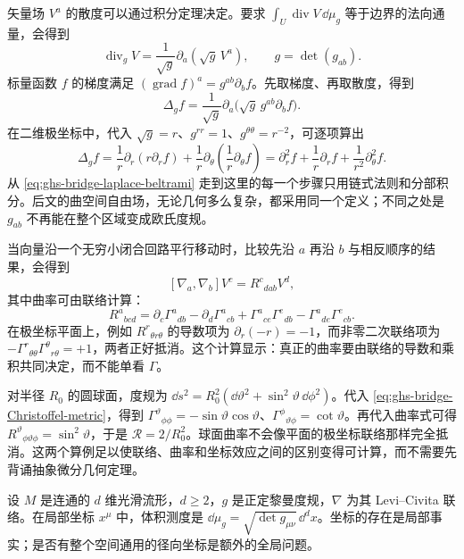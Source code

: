矢量场 $V^a$ 的散度可以通过积分定理决定。要求 $\int_U\operatorname{div}V\,\dd\mu_g$ 等于边界的法向通量，会得到
\[
 \operatorname{div}_gV=\frac1{\sqrt{g}}\partial_a(\sqrt g\,V^a),
 \qquad g=\det(g_{ab}).
\]
标量函数 $f$ 的梯度满足 $(\operatorname{grad}f)^a=g^{ab}\partial_bf$。先取梯度、再取散度，得到
\begin{equation}\label{eq:ghs-bridge-laplace-beltrami}
 \Delta_gf=\frac1{\sqrt g}\partial_a\bigl(\sqrt g\,g^{ab}\partial_bf\bigr).
\end{equation}
在二维极坐标中，代入 $\sqrt g=r$、$g^{rr}=1$、$g^{\theta\theta}=r^{-2}$，可逐项算出
\[
 \Delta_gf=\frac1r\partial_r(r\partial_rf)
 +\frac1r\partial_\theta\left(\frac1r\partial_\theta f\right)
 =\partial_r^2f+\frac1r\partial_rf+\frac1{r^2}\partial_\theta^2f.
\]
从 \cref{eq:ghs-bridge-laplace-beltrami} 走到这里的每一个步骤只用链式法则和分部积分。后文的曲空间自由场，无论几何多么复杂，都采用同一个定义；不同之处是 $g_{ab}$ 不再能在整个区域变成欧氏度规。

当向量沿一个无穷小闭合回路平行移动时，比较先沿 $a$ 再沿 $b$ 与相反顺序的结果，会得到
\[
 [\nabla_a,\nabla_b]V^c=R^c{}_{dab}V^d,
\]
其中曲率可由联络计算：
\begin{equation}\label{eq:ghs-bridge-Riemann-coordinate}
 R^a{}_{bcd}=\partial_c\Gamma^a{}_{db}-\partial_d\Gamma^a{}_{cb}
 +\Gamma^a{}_{ce}\Gamma^e{}_{db}-\Gamma^a{}_{de}\Gamma^e{}_{cb}.
\end{equation}
在极坐标平面上，例如 $R^r{}_{\theta r\theta}$ 的导数项为
$\partial_r(-r)=-1$，而非零二次联络项为
$-\Gamma^r{}_{\theta\theta}\Gamma^\theta{}_{r\theta}=+1$，两者正好抵消。这个计算显示：真正的曲率要由联络的导数和乘积共同决定，而不能单看 $\Gamma$。

对半径 $R_0$ 的圆球面，度规为 $\dd s^2=R_0^2(\dd\vartheta^2+\sin^2\vartheta\,\dd\phi^2)$。代入 \cref{eq:ghs-bridge-Christoffel-metric}，得到 $\Gamma^\vartheta{}_{\phi\phi}=-\sin\vartheta\cos\vartheta$、$\Gamma^\phi{}_{\vartheta\phi}=\cot\vartheta$。再代入曲率式可得 $R^\vartheta{}_{\phi\vartheta\phi}=\sin^2\vartheta$，于是 $\mathcal R=2/R_0^2$。球面曲率不会像平面的极坐标联络那样完全抵消。这两个算例足以使联络、曲率和坐标效应之间的区别变得可计算，而不需要先背诵抽象微分几何定理。

设 $M$ 是连通的 $d$ 维光滑流形，$d\geq 2$，$g$ 是正定黎曼度规，$\nabla$ 为其 Levi--Civita 联络。在局部坐标 $x^\mu$ 中，体积测度是 $\dd\mu_g=\sqrt{\det g_{\mu\nu}}\,\dd^d x$。坐标的存在是局部事实；是否有整个空间通用的径向坐标是额外的全局问题。

